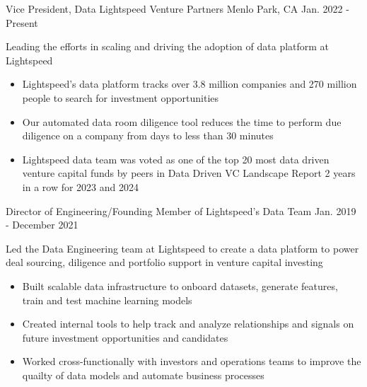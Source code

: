 

\begin{cventries}

  \cventry
  {Vice President, Data} %
  {Lightspeed Venture Partners} %
  {Menlo Park, CA} %
  {Jan. 2022 - Present} %
  {
    \begin{cvitems} %
      \item{Leading the efforts in scaling and driving the adoption of data platform at Lightspeed}
      \begin{itemize}[label=$\circ$]
        \item{Lightspeed's data platform tracks over 3.8 million companies and 270 million people to search for investment opportunities}
        \item{Our automated data room diligence tool reduces the time to perform due diligence on a company from days to less than 30 minutes}
        \item{Lightspeed data team was voted as one of the top 20 most data driven venture capital funds by peers in Data Driven VC Landscape Report 2 years in a row for 2023 and 2024}
      \end{itemize}
    \end{cvitems}
  }

  \cventry
  {Director of Engineering/Founding Member of Lightspeed's Data Team} %
  {} %
  {} %
  {Jan. 2019 - December 2021} %
  {
    \begin{cvitems} %
      \item{Led the Data Engineering team at Lightspeed to create a data platform to power deal sourcing, diligence and portfolio support in venture capital investing}
      \begin{itemize}[label=$\circ$]
        \item{Built scalable data infrastructure to onboard datasets, generate features, train and test machine learning models}
        \item{Created internal tools to help track and analyze relationships and signals on future investment opportunities and candidates}
        \item{Worked cross-functionally with investors and operations teams to improve the quailty of data models and automate business processes}
      \end{itemize}
    \end{cvitems}
  }


\end{cventries}
